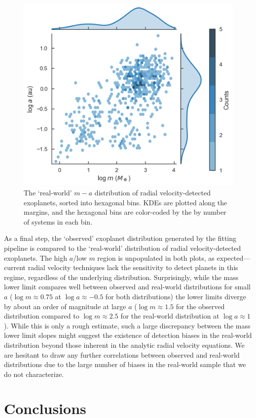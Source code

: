 \documentclass[12pt,manuscript]{aastex}
\begin{document}
\begin{figure}[ht]
  \centering
  \includegraphics[width=0.7\linewidth]{../figures/real_world_dist}
  \caption{The `real-world' $m-a$ distribution of radial velocity-detected exoplanets, sorted into hexagonal bins. KDEs are plotted along the margins, and the hexagonal bins are color-coded by the by number of systems in each bin.}
  \label{fig: 2d real world}
\end{figure}

As a final step, the `observed' exoplanet distribution generated by the fitting pipeline is compared to the `real-world' distribution of radial velocity-detected exoplanets.
The high $a$/low $m$ region is unpopulated in both plots, as expected---current radial velocity techniques lack the sensitivity to detect planets in this regime, regardless of the underlying distribution.
Surprisingly, while the mass lower limit compares well between observed and real-world distributions for small $a$ ($\log m \approx 0.75$ at $\log a \approx -0.5$ for both distributions) the lower limits diverge by about an order of magnitude at large $a$ ($\log m \approx 1.5$ for the observed distribution compared to $\log m \approx 2.5$ for the real-world distribution at $\log a \approx 1$).
While this is only a rough estimate, such a large discrepancy between the mass lower limit slopes might suggest the existence of detection biases in the real-world distribution beyond those inherent in the analytic radial velocity equations.
We are hesitant to draw any further correlations between observed and real-world distributions due to the large number of biases in the real-world sample that we do not characterize.

\FloatBarrier
\section{Conclusions}
\label{section: conclusion}
\end{document}
